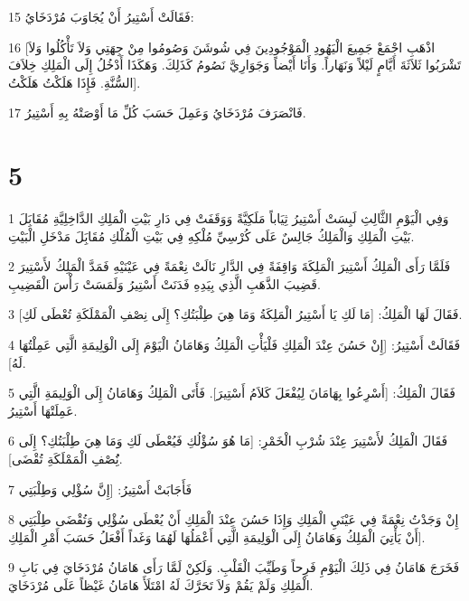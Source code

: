 \par 15 فَقَالَتْ أَسْتِيرُ أَنْ يُجَاوَبَ مُرْدَخَايُ:
\par 16 [اذْهَبِ اجْمَعْ جَمِيعَ الْيَهُودِ الْمَوْجُودِينَ فِي شُوشَنَ وَصُومُوا مِنْ جِهَتِي وَلاَ تَأْكُلُوا وَلاَ تَشْرَبُوا ثَلاَثَةَ أَيَّامٍ لَيْلاً وَنَهَاراً. وَأَنَا أَيْضاً وَجَوَارِيَّ نَصُومُ كَذَلِكَ. وَهَكَذَا أَدْخُلُ إِلَى الْمَلِكِ خِلاَفَ السُّنَّةِ. فَإِذَا هَلَكْتُ هَلَكْتُ].
\par 17 فَانْصَرَفَ مُرْدَخَايُ وَعَمِلَ حَسَبَ كُلِّ مَا أَوْصَتْهُ بِهِ أَسْتِيرُ.

\chapter{5}

\par 1 وَفِي الْيَوْمِ الثَّالِثِ لَبِسَتْ أَسْتِيرُ ثِيَاباً مَلَكِيَّةً وَوَقَفَتْ فِي دَارِ بَيْتِ الْمَلِكِ الدَّاخِلِيَّةِ مُقَابَِلَ بَيْتِ الْمَلِكِ وَالْمَلِكُ جَالِسٌ عَلَى كُرْسِيِّ مُلْكِهِ فِي بَيْتِ الْمُلْكِ مُقَابَِلَ مَدْخَلِ الْبَيْتِ.
\par 2 فَلَمَّا رَأَى الْمَلِكُ أَسْتِيرَ الْمَلِكَةَ وَاقِفَةً فِي الدَّارِ نَالَتْ نِعْمَةً فِي عَيْنَيْهِ فَمَدَّ الْمَلِكُ لأَسْتِيرَ قَضِيبَ الذَّهَبِ الَّذِي بِيَدِهِ فَدَنَتْ أَسْتِيرُ وَلَمَسَتْ رَأْسَ الْقَضِيبِ.
\par 3 فَقَالَ لَهَا الْمَلِكُ: [مَا لَكِ يَا أَسْتِيرُ الْمَلِكَةُ وَمَا هِيَ طِلْبَتُكِ؟ إِلَى نِصْفِ الْمَمْلَكَةِ تُعْطَى لَكِ].
\par 4 فَقَالَتْ أَسْتِيرُ: [إِنْ حَسُنَ عِنْدَ الْمَلِكِ فَلْيَأْتِ الْمَلِكُ وَهَامَانُ الْيَوْمَ إِلَى الْوَلِيمَةِ الَّتِي عَمِلْتُهَا لَهُ].
\par 5 فَقَالَ الْمَلِكُ: [أَسْرِعُوا بِهَامَانَ لِيُفْعَلَ كَلاَمُ أَسْتِيرَ]. فَأَتَى الْمَلِكُ وَهَامَانُ إِلَى الْوَلِيمَةِ الَّتِي عَمِلَتْهَا أَسْتِيرُ.
\par 6 فَقَالَ الْمَلِكُ لأَسْتِيرَ عِنْدَ شُرْبِ الْخَمْرِ: [مَا هُوَ سُؤْلُكِ فَيُعْطَى لَكِ وَمَا هِيَ طِلْبَتُكِ؟ إِلَى نَُِصْفِ الْمَمْلَكَةِ تُقْضَى].
\par 7 فَأَجَابَتْ أَسْتِيرُ: [إِنَّ سُؤْلِي وَطِلْبَتِي
\par 8 إِنْ وَجَدْتُ نِعْمَةً فِي عَيْنَيِ الْمَلِكِ وَإِذَا حَسُنَ عِنْدَ الْمَلِكِ أَنْ يُعْطَى سُؤْلِي وَتُقْضَى طِلْبَتِي أَنْ يَأْتِيَ الْمَلِكُ وَهَامَانُ إِلَى الْوَلِيمَةِ الَّتِي أَعْمَلُهَا لَهُمَا وَغَداً أَفْعَلُ حَسَبَ أَمْرِ الْمَلِكِ].
\par 9 فَخَرَجَ هَامَانُ فِي ذَلِكَ الْيَوْمِ فَرِحاً وَطَيِّبَ الْقَلْبِ. وَلَكِنْ لَمَّا رَأَى هَامَانُ مُرْدَخَايَ فِي بَابِ الْمَلِكِ وَلَمْ يَقُمْ وَلاَ تَحَرَّكَ لَهُ امْتَلَأَ هَامَانُ غَيْظاً عَلَى مُرْدَخَايَ.
